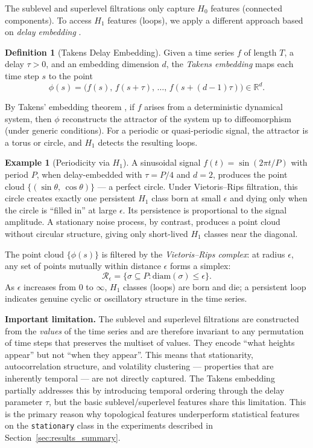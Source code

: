 \documentclass[12pt, a4paper]{article}
\theoremstyle{definition}
\newtheorem{definition}{Definition}[section]
\newtheorem{example}{Example}[section]
\theoremstyle{plain}
\newcommand{\R}{\mathbb{R}}
\begin{document}
The sublevel and superlevel filtrations only capture $H_0$ features (connected
components). To access $H_1$ features (loops), we apply a different approach
based on \emph{delay embedding} \citep{takens1981detecting}.

\begin{definition}[Takens Delay Embedding]
Given a time series $f$ of length $T$, a delay $\tau > 0$, and an embedding
dimension $d$, the \emph{Takens embedding} maps each time step $s$ to the point
\[
  \phi(s) = \bigl(f(s),\, f(s+\tau),\, \ldots,\, f(s+(d-1)\tau)\bigr) \in \R^d.
\]
\end{definition}

By Takens' embedding theorem \citep{takens1981detecting}, if $f$ arises from a
deterministic dynamical system, then $\phi$ reconstructs the attractor of the
system up to diffeomorphism (under generic conditions). For a periodic or
quasi-periodic signal, the attractor is a torus or circle, and $H_1$ detects the
resulting loops.

\begin{example}[Periodicity via $H_1$]
A sinusoidal signal $f(t) = \sin(2\pi t / P)$ with period $P$, when delay-embedded
with $\tau = P/4$ and $d = 2$, produces the point cloud
$\{(\sin\theta,\, \cos\theta)\}$ — a perfect circle. Under Vietoris--Rips
filtration, this circle creates exactly one persistent $H_1$ class born at small
$\epsilon$ and dying only when the circle is ``filled in'' at large $\epsilon$.
Its persistence is proportional to the signal amplitude. A stationary noise
process, by contrast, produces a point cloud without circular structure, giving
only short-lived $H_1$ classes near the diagonal.
\end{example}

The point cloud $\{\phi(s)\}$ is filtered by the \emph{Vietoris--Rips
complex}: at radius $\epsilon$, any set of points mutually within distance
$\epsilon$ forms a simplex:
\[
  \mathcal{R}_\epsilon = \bigl\{\sigma \subseteq P :
    \mathrm{diam}(\sigma) \leq \epsilon \bigr\}.
\]
As $\epsilon$ increases from 0 to $\infty$, $H_1$ classes (loops) are born and
die; a persistent loop indicates genuine cyclic or oscillatory structure in the
time series.

\medskip\noindent
\textbf{Important limitation.} The sublevel and superlevel filtrations are
constructed from the \emph{values} of the time series and are therefore invariant
to any permutation of time steps that preserves the multiset of values. They
encode ``what heights appear'' but not ``when they appear''. This means that
stationarity, autocorrelation structure, and volatility clustering — properties
that are inherently temporal — are not directly captured. The Takens embedding
partially addresses this by introducing temporal ordering through the delay
parameter $\tau$, but the basic sublevel/superlevel features share this limitation.
This is the primary reason why topological features underperform statistical
features on the \texttt{stationary} class in the experiments described in
Section~\ref{sec:results_summary}.
\end{document}
